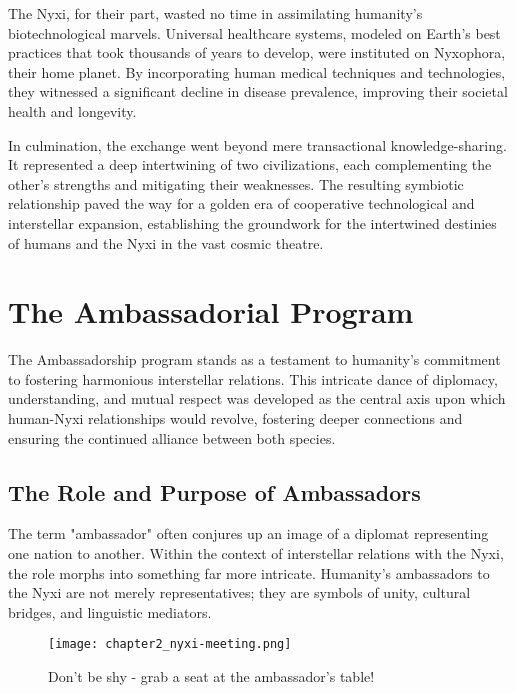 The Nyxi, for their part, wasted no time in assimilating humanity's
biotechnological marvels. Universal healthcare systems, modeled on Earth's best
practices that took thousands of years to develop, were instituted on
Nyxophora, their home planet. By incorporating human medical techniques and
technologies, they witnessed a significant decline in disease prevalence,
improving their societal health and longevity.

In culmination, the exchange went beyond mere transactional knowledge-sharing.
It represented a deep intertwining of two civilizations, each complementing the
other's strengths and mitigating their weaknesses. The resulting symbiotic
relationship paved the way for a golden era of cooperative technological and
interstellar expansion, establishing the groundwork for the intertwined
destinies of humans and the Nyxi in the vast cosmic theatre.



\chapter{The Ambassadorial Program}

The Ambassadorship program stands as a testament to humanity's commitment to
fostering harmonious interstellar relations. This intricate dance of diplomacy,
understanding, and mutual respect was developed as the central axis upon which
human-Nyxi relationships would revolve, fostering deeper connections and
ensuring the continued alliance between both species.

\section{The Role and Purpose of Ambassadors}

The term "ambassador" often conjures up an image of a diplomat representing one
nation to another. Within the context of interstellar relations with the Nyxi,
the role morphs into something far more intricate. Humanity's ambassadors to
the Nyxi are not merely representatives; they are symbols of unity, cultural
bridges, and linguistic mediators.

\begin{wrapfigure}{r}{0.5\textwidth}
	\begin{center}
		\texttt{[image: chapter2\_nyxi-meeting.png]}
	\end{center}
	\caption{Don't be shy - grab a seat at the ambassador's table!}
\end{wrapfigure}


